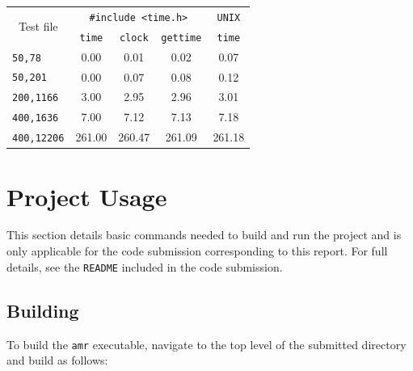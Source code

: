 \documentclass{article}
\begin{document}
\begin{minipage}{\linewidth}
\begin{minipage}{0.4\linewidth}
    \end{minipage}
    \hspace{0.02\linewidth}
    \begin{minipage}{0.45\linewidth}
        \centering
        \begin{tabular}{|l|c|c|c|c|}
            \hline
            \multicolumn{1}{|c|}{\multirow{2}{*}{Test file}} & \multicolumn{3}{|c|}{\texttt{\#include <time.h>}} & \texttt{UNIX} \\
            \cline{2-5}
            \multicolumn{1}{|c|}{} & \texttt{time} & \texttt{clock} & \texttt{gettime} & \texttt{time} \\
            \hline
            \hline
            \texttt{50,78}     & 0.00 & 0.01 & 0.02 & 0.07 \\
            \texttt{50,201}    & 0.00 & 0.07 & 0.08 & 0.12 \\
            \texttt{200,1166}  & 3.00 & 2.95 & 2.96 & 3.01 \\
            \texttt{400,1636}  & 7.00 & 7.12 & 7.13 & 7.18 \\
            \texttt{400,12206} & 261.00 & 260.47 & 261.09 & 261.18 \\
            \hline
        \end{tabular}

        \label{tab:runtime}

    \end{minipage}
\end{minipage}

\section*{Project Usage}
\label{sec:project}

This section details basic commands needed to build and run the project and is
only applicable for the code submission corresponding to this report. For full
details, see the \texttt{README} included in the code submission.

\subsection*{Building}
\label{subsec:building}

To build the \texttt{amr} executable, navigate to the top level of the
submitted directory and build as follows:
\end{document}
